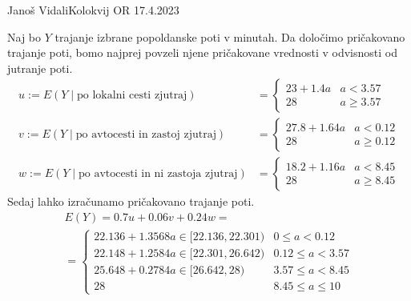 \begin{naloga}{Janoš Vidali}{Kolokvij OR 17.4.2023}
\begin{odgovor}
\begin{enumerate}[(a)]
Naj bo $Y$ trajanje izbrane popoldanske poti v minutah.
Da določimo pričakovano trajanje poti,
bomo najprej povzeli njene pričakovane vrednosti
v odvisnosti od jutranje poti.
\begin{align*}
u := E(Y \mid \text{po lokalni cesti zjutraj})
&= \begin{cases}
23 + 1.4a & a < 3.57 \\
28 & a \ge 3.57
\end{cases} \\
v := E(Y \mid \text{po avtocesti in zastoj zjutraj})
&= \begin{cases}
27.8 + 1.64a & a < 0.12 \\
28 & a \ge 0.12
\end{cases} \\
w := E(Y \mid \text{po avtocesti in ni zastoja zjutraj})
&= \begin{cases}
18.2 + 1.16a & a < 8.45 \\
28 & a \ge 8.45
\end{cases}
\end{align*}
Sedaj lahko izračunamo pričakovano trajanje poti.
\begin{multline*}
E(Y) = 0.7 u + 0.06 v + 0.24 w = \\
= \begin{cases}
22.136 + 1.3568 a \in [22.136, 22.301) & 0 \le a < 0.12 \\
22.148 + 1.2584 a \in [22.301, 26.642) & 0.12 \le a < 3.57 \\
25.648 + 0.2784 a \in [26.642, 28) & 3.57 \le a < 8.45 \\
28 & 8.45 \le a \le 10
\end{cases}
\end{multline*}
\end{enumerate}

\begin{slika}
\makebox[\textwidth][c]{
\pgfslika[zastoj-a]
}
\end{slika}

\begin{slika}
\makebox[\textwidth][c]{
\pgfslika[zastoj-b]
}
\end{slika}
\end{odgovor}
\end{naloga}
